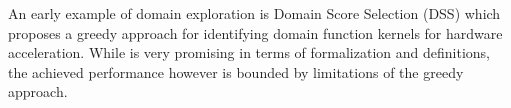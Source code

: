 An early example of domain exploration is Domain Score Selection (DSS) \cite{zhang100ds} which proposes a greedy approach for identifying domain function kernels for hardware acceleration. While \cite{zhang100ds} is very promising in terms of formalization and definitions, the achieved performance however is bounded by limitations of the greedy approach.


